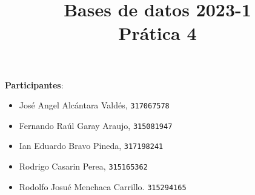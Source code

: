 \documentclass[12pt,letterpaper]{article}
\title{Bases de datos 2023-1\\
Prática 4}
\begin{document}
\maketitle

\textbf{Participantes}:
\begin{itemize}
	\item José Angel Alcántara Valdés, \texttt{317067578}\\
	\item Fernando Raúl Garay Araujo, \texttt{315081947}\\
	\item Ian Eduardo Bravo Pineda, \texttt{317198241}\\
	\item Rodrigo Casarin Perea, \texttt{315165362}\\
	\item Rodolfo Josué Menchaca Carrillo. \texttt{315294165}\\
\end{itemize}
\end{document}
